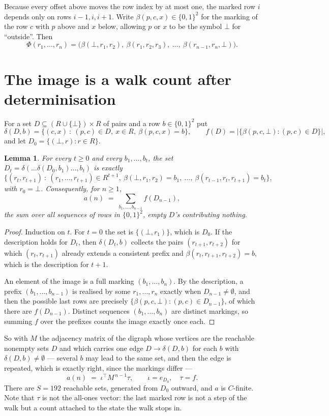 \documentclass[11pt,a4paper]{article}
\theoremstyle{plain}
\newtheorem{lemma}[theorem]{Lemma}
\theoremstyle{definition}
\begin{document}
Because every offset above moves the row index by at most one, the marked row $i$ depends only
on rows $i-1,i,i+1$. Write $\beta(p,c,x)\in\{0,1\}^{2}$ for the marking of the row $c$
with $p$ above and $x$ below, allowing $p$ or $x$ to be the symbol $\bot$ for ``outside''.
Then
\[
\Phi(r_1,\dots,r_n)=\bigl(\beta(\bot,r_1,r_2),\ \beta(r_1,r_2,r_3),\ \dots,\
\beta(r_{n-1},r_n,\bot)\bigr).
\]

\section{The image is a walk count after determinisation}

For a set $D\subseteq(R\cup\{\bot\})\times R$ of pairs and a row $b\in\{0,1\}^{2}$ put
\[
\delta(D,b)=\{(c,x)\ :\ (p,c)\in D,\ x\in R,\ \beta(p,c,x)=b\},\qquad
f(D)=\bigl|\{\beta(p,c,\bot):(p,c)\in D\}\bigr| ,
\]
and let $D_0=\{(\bot,r):r\in R\}$.

\begin{lemma}\label{lem:det}
For every $t\ge0$ and every $b_1,\dots,b_t$, the set
$D_t=\delta(\dots\delta(D_0,b_1)\dots,b_t)$ is exactly
\[
\{(r_t,r_{t+1})\ :\ (r_1,\dots,r_{t+1})\in R^{t+1},\ \beta(\bot,r_1,r_2)=b_1,\ \dots,\
\beta(r_{t-1},r_t,r_{t+1})=b_t\} ,
\]
with $r_0=\bot$. Consequently, for $n\ge1$,
\[
a(n)\;=\;\sum_{b_1,\dots,b_{n-1}}f(D_{n-1}),
\]
the sum over all sequences of rows in $\{0,1\}^{2}$, empty $D$'s contributing nothing.
\end{lemma}

\begin{proof}
Induction on $t$. For $t=0$ the set is $\{(\bot,r_1)\}$, which is $D_0$. If the description
holds for $D_t$, then $\delta(D_t,b)$ collects the pairs $(r_{t+1},r_{t+2})$ for which
$(r_t,r_{t+1})$ already extends a consistent prefix and
$\beta(r_t,r_{t+1},r_{t+2})=b$, which is the description for $t+1$.

An element of the image is a full marking $(b_1,\dots,b_n)$. By the description, a prefix
$(b_1,\dots,b_{n-1})$ is realised by some $r_1,\dots,r_n$ exactly when $D_{n-1}\neq
\emptyset$, and then the possible last rows are precisely
$\{\beta(p,c,\bot):(p,c)\in D_{n-1}\}$, of which there are $f(D_{n-1})$. Distinct
sequences $(b_1,\dots,b_n)$ are distinct markings, so summing $f$ over the prefixes counts the
image exactly once each.
\end{proof}

So with $M$ the adjacency matrix of the digraph whose vertices are the reachable nonempty sets
$D$ and which carries one edge $D\to\delta(D,b)$ for each $b$ with $\delta(D,b)\neq\emptyset$
--- several $b$ may lead to the same set, and then the edge is repeated, which is exactly
right, since the markings differ ---
\[
a(n)\;=\;\iota^{\!\top}M^{\,n-1}\tau,\qquad \iota=e_{D_0},\quad \tau=f .
\]
There are $S=192$ reachable sets, generated from $D_0$ outward, and $a$ is $C$-finite. Note
that $\tau$ is not the all-ones vector: the last marked row is not a step of the walk but a
count attached to the state the walk stops in.
\end{document}
